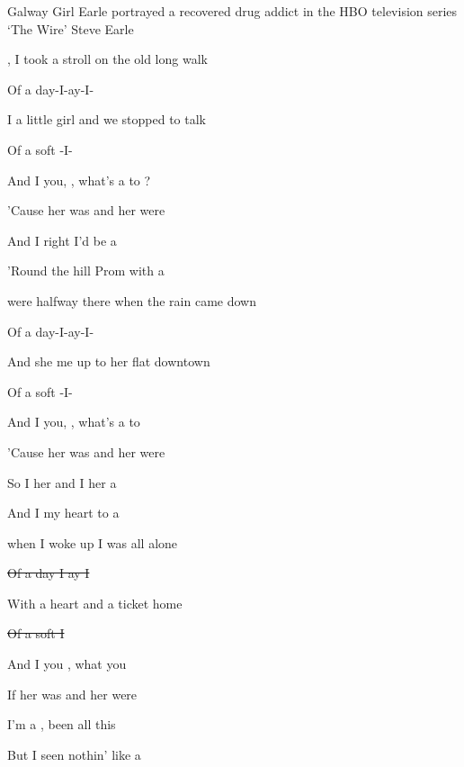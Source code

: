 \begin{SBSong}{Galway Girl}
  {Earle portrayed a recovered drug addict in the HBO television series `The Wire'}
  {Steve Earle}
  \begin{SBVerse}
    , I took a stroll on the old long walk 
    
    Of a day-I-ay-I-
    
    I  a little girl and we stopped to talk 
    
    Of a  soft -I- 
    
    And I  you, , what's a  to ? 
    
    'Cause her  was  and her  were  
    
    And I  right  I'd be  a  
    
    'Round the hill Prom with a  
  \end{SBVerse}
  \begin{SBVerse}
     were halfway there when the rain came down 
    
    Of a day-I-ay-I-
    
    And she  me up to her flat downtown
    
    Of a  soft -I-
    
    And I  you, , what's a  to 
    
    'Cause her  was  and her  were  
    
    So I  her  and I  her a  
    
    And I  my heart to a   
  \end{SBVerse}
  \begin{SBVerse}
     when I woke up I was all alone 
    
    \sout{Of a day I ay I }
    
    With a  heart and a ticket home
    
    \sout{Of a  soft  I }
    
    And I  you , what  you  
    
    If her  was  and her  were  
    
    I'm a  , been all  this  
    
    But I  seen nothin' like a   
  \end{SBVerse}
\end{SBSong}
